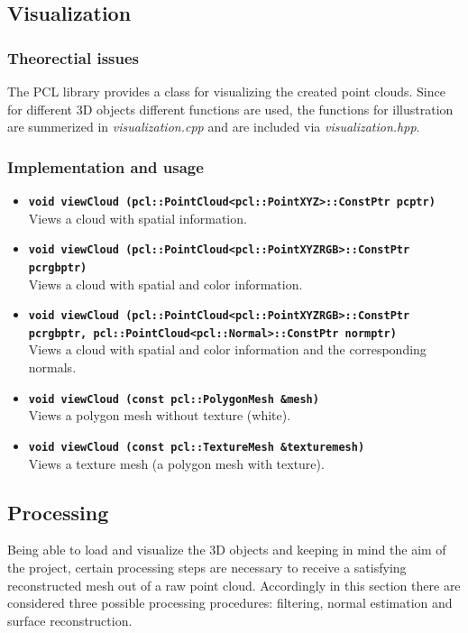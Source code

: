 \documentclass[paper=a4,11pt,bibliography=totoc]{scrartcl}
\begin{document}
\subsection{Visualization}
\subsubsection*{\color{darkgreen}Theorectial issues}
%
The PCL library provides a class for visualizing the created point clouds. Since for different 3D objects different functions are used, the functions for illustration are summerized in \textit{visualization.cpp} and are included via \textit{visualization.hpp}.
%
\subsubsection*{\color{darkred}Implementation and usage}
%
\begin{itemize}
\item \textbf{\texttt{void viewCloud (pcl::PointCloud<pcl::PointXYZ>::ConstPtr pcptr)}}\\
\textsf{Views a cloud with spatial information.}
\item \textbf{\texttt{void viewCloud (pcl::PointCloud<pcl::PointXYZRGB>::ConstPtr\\pcrgbptr)}}\\
\textsf{Views a cloud with spatial and color information.}
\item \textbf{\texttt{void viewCloud (pcl::PointCloud<pcl::PointXYZRGB>::ConstPtr\\pcrgbptr, pcl::PointCloud<pcl::Normal>::ConstPtr normptr)}}\\
\textsf{Views a cloud with spatial and color information and the corresponding normals.}
\item \textbf{\texttt{void viewCloud (const pcl::PolygonMesh \&mesh)}}\\
\textsf{Views a polygon mesh without texture (white).}
\item \textbf{\texttt{void viewCloud (const pcl::TextureMesh \&texturemesh)}}\\
\textsf{Views a texture mesh (a polygon mesh with texture).}
\end{itemize}
%
\subsection{Processing}
%
Being able to load and visualize the 3D objects and keeping in mind the aim of the project, certain processing steps are necessary to receive a satisfying reconstructed mesh out of a raw point cloud. Accordingly in this section there are considered three possible processing procedures: filtering, normal estimation and surface reconstruction.
\end{document}

